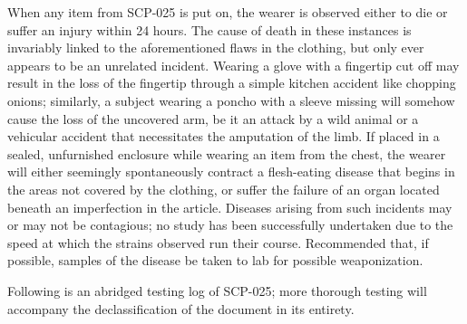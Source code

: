 When any item from SCP-025 is put on, the wearer is observed either to die or suffer an injury within 24 hours. The cause of death in these instances is invariably linked to the aforementioned flaws in the clothing, but only ever appears to be an unrelated incident. Wearing a glove with a fingertip cut off may result in the loss of the fingertip through a simple kitchen accident like chopping onions; similarly, a subject wearing a poncho with a sleeve missing will somehow cause the loss of the uncovered arm, be it an attack by a wild animal or a vehicular accident that necessitates the amputation of the limb. If placed in a sealed, unfurnished enclosure while wearing an item from the chest, the wearer will either seemingly spontaneously contract a flesh-eating disease that begins in the areas not covered by the clothing, or suffer the failure of an organ located beneath an imperfection in the article. Diseases arising from such incidents may or may not be contagious; no study has been successfully undertaken due to the speed at which the strains observed run their course. Recommended that, if possible, samples of the disease be taken to lab for possible weaponization.

Following is an abridged testing log of SCP-025; more thorough testing will accompany the declassification of the document in its entirety.

